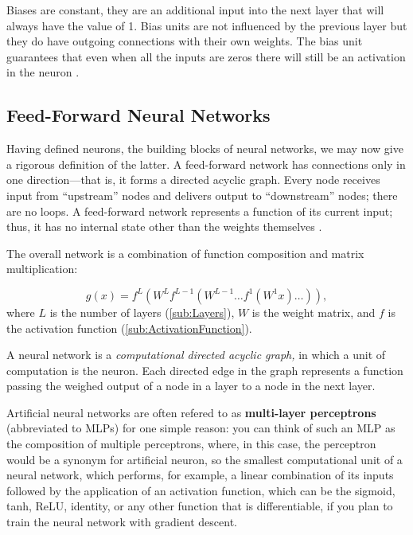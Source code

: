 \documentclass{article}
\begin{document}
\begin{definition}[Bias]\label{def:bias}
  Biases are constant, they are an additional input into the next layer that will always have the value of 1. Bias units are not influenced by the previous layer but they do have outgoing connections with their own weights. The bias unit guarantees that even when all the inputs are zeros there will still be an activation in the neuron \citep{WeightsBias}. 
\end{definition}
\subsection{Feed-Forward Neural Networks}%
  \label{sub:Feed-Forward Neural Networks}
  Having defined neurons, the building blocks of neural networks, we may now give a rigorous definition of the latter. A feed-forward network has connections only in one direction—that is, it forms a directed acyclic graph. Every node receives input from “upstream” nodes and delivers output to “downstream” nodes; there are no loops. A feed-forward network represents a function of its current input; thus, it has no internal state other than the weights themselves \citep{book:AIModernApp}.

The overall network is a combination of function composition and matrix multiplication:

  $$g(x) = f^L (W^Lf^{L-1}(W^{L-1} \hdots f^1(W^1x)\hdots)), $$
  where $L$ is the number of layers (\autoref{sub:Layers}), $W$ is the weight matrix, and $f$ is the activation function (\ref{sub:ActivationFunction}).
 \begin{definition}
  A neural network is a \textit{computational directed acyclic graph,} in which a unit of computation is the neuron. Each directed edge in the graph represents a function passing the weighed output of a node in a layer to a node in the next layer.
 \end{definition} 

   Artificial neural networks are often refered to as \textbf{multi-layer perceptrons} (abbreviated to MLPs) for one simple reason: you can think of such an MLP as the composition of multiple perceptrons, where, in this case, the perceptron would be a synonym for artificial neuron, so the smallest computational unit of a neural network, which performs, for example, a linear combination of its inputs followed by the application of an activation function, which can be the sigmoid, tanh, ReLU, identity, or any other function that is differentiable, if you plan to train the neural network with gradient descent.
\end{document}
